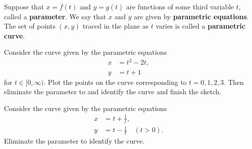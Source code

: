 

\begin{definition}
Suppose that $x=f(t)$ and $y=g(t)$ are functions of some third variable $t$, called a \textbf{parameter}.
We say that $x$ and $y$ are given by \textbf{parametric equations}.
The set of points $(x,y)$ traced in the plane as $t$ varies is called a \textbf{parametric curve}.
\end{definition}

\begin{example}
Consider the curve given by the parametric equations
\begin{align*}
x&=t^2-2t,\\
y&=t+1
\end{align*}
for $t\in [0,\infty)$.
Plot the points on the curve corresponding to $t=0, 1, 2, 3$.
Then eliminate the parameter to and identify the curve and finish the sketch.
\end{example}

\newpage

\begin{example}
Consider the curve given by the parametric equations
\begin{align*}
x &= t + \frac{1}{t},\\
y &= t - \frac{1}{t} \quad (t>0).
\end{align*}
Eliminate the parameter to identify the curve.
\end{example}

\newpage


